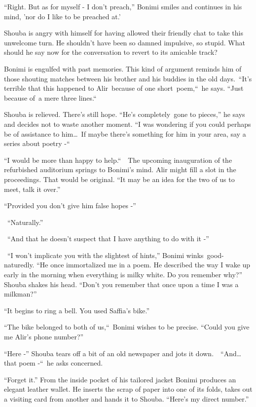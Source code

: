 \documentclass[twoside,11pt]{book}
\begin{document}
``Right. But as for myself - I don't preach,'' Bonimi smiles and continues in his mind, {}'nor
do I like to be preached at.'

Shouba is angry with himself for having allowed their friendly chat to take this unwelcome turn. He shouldn't have been
so damned impulsive, so stupid. What should he say now for the conversation to revert to its amicable track?

Bonimi is engulfed with past memories. This kind of argument reminds him of those shouting matches between his brother
and his buddies in the old days.\ ``It's terrible that this happened to Alir\ because of one
short\ poem,``\  he says. ``Just because of{\ }{a }mere three lines.``\ 

Shouba is relieved. There's still hope. ``He's completely~gone to pieces,'' he says and
decides not to waste another moment. ``I was wondering if you could perhaps be of assistance to
him{\dots}\ If maybe there's something for him in your area, say a series about poetry -``\ 

``I would be more than happy to help.``\ \ The upcoming inauguration of the refurbished
auditorium springs to Bonimi's mind. Alir might fill a slot in the proceedings. That would be original.
``It may be an idea for the two of us to meet, talk it over.''

``Provided you don't give him false hopes -''

~``Naturally.''

~``And that he doesn't suspect that I have anything to do with it -''

~``I won't implicate you with the slightest of hints,'' Bonimi winks\ good-naturedly.
``He once immortalized me in a poem. He described the way I wake up early in the morning when everything
is milky white. Do you remember why?'' Shouba shakes his head. ``Don't you remember that once
upon a time I was a milkman?''

``It begins to ring a bell. You used Saffia's bike.''

``The bike belonged to both of us,``\ Bonimi wishes to be precise. ``Could you
give me Alir's phone number?''

``Here -'' Shouba tears off {a bit of an }old newspaper and jots it
down.\ \ ``And{\dots} that poem -``\ he asks concerned.

``Forget it.'' From the inside pocket of his tailored jacket Bonimi produces an elegant
leather wallet. He inserts the scrap of paper into one of its folds, takes out a visiting card from another and hands
it to Shouba. ``Here's my direct number.''
\end{document}
